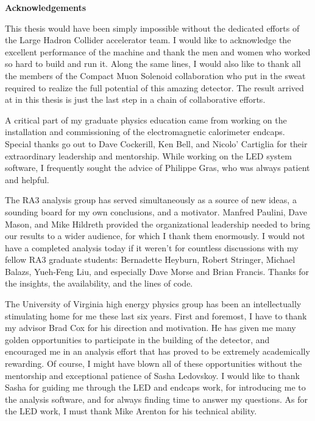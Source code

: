 \documentclass[dissertation.tex]{subfiles}
\begin{document}
\thispagestyle{myheadings}
\markright{\hfill}

\begin{center}
\textbf{Acknowledgements}
\end{center}

This thesis would have been simply impossible without the dedicated efforts of the Large Hadron Collider accelerator team.  I would like to acknowledge the excellent performance of the machine and thank the men and women who worked so hard to build and run it.  Along the same lines, I would also like to thank all the members of the Compact Muon Solenoid collaboration who put in the sweat required to realize the full potential of this amazing detector.  The result arrived at in this thesis is just the last step in a chain of collaborative efforts.

A critical part of my graduate physics education came from working on the installation and commissioning of the electromagnetic calorimeter endcaps.  Special thanks go out to Dave Cockerill, Ken Bell, and Nicolo' Cartiglia for their extraordinary leadership and mentorship.  While working on the LED system software, I frequently sought the advice of Philippe Gras, who was always patient and helpful.

The RA3 analysis group has served simultaneously as a source of new ideas, a sounding board for my own conclusions, and a motivator.  Manfred Paulini, Dave Mason, and Mike Hildreth provided the organizational leadership needed to bring our results to a wider audience, for which I thank them enormously.  I would not have a completed analysis today if it weren't for countless discussions with my fellow RA3 graduate students: Bernadette Heyburn, Robert Stringer, Michael Balazs, Yueh-Feng Liu, and especially Dave Morse and Brian Francis.  Thanks for the insights, the availability, and the lines of code.

The University of Virginia high energy physics group has been an intellectually stimulating home for me these last six years.  First and foremost, I have to thank my advisor Brad Cox for his direction and motivation.  He has given me many golden opportunities to participate in the building of the detector, and encouraged me in an analysis effort that has proved to be extremely academically rewarding.  Of course, I might have blown all of these opportunities without the mentorship and exceptional patience of Sasha Ledovskoy.  I would like to thank Sasha for guiding me through the LED and endcaps work, for introducing me to the analysis software, and for always finding time to answer my questions.  As for the LED work, I must thank Mike Arenton for his technical ability.
\end{document}
